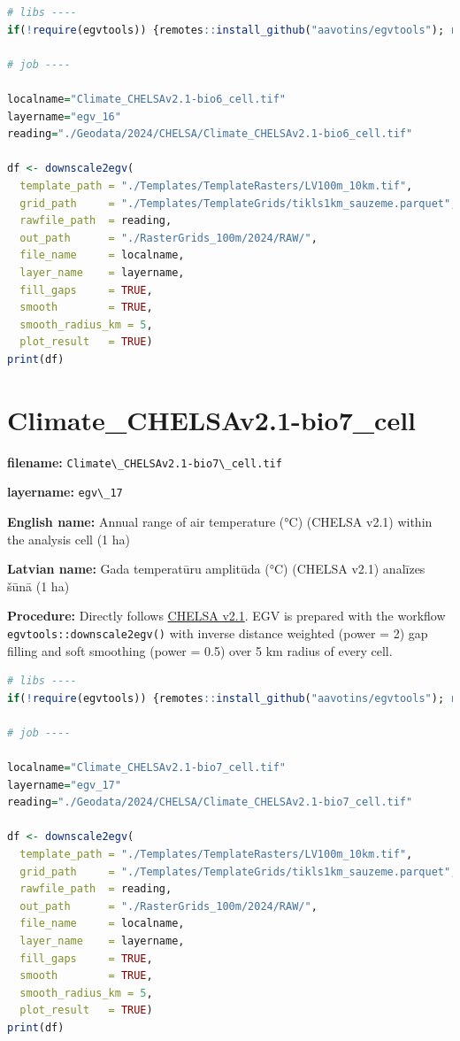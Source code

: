 \documentclass[
]{book}
\newcommand{\passthrough}[1]{#1}
\begin{document}
\begin{lstlisting}[language=R]
# libs ----
if(!require(egvtools)) {remotes::install_github("aavotins/egvtools"); require(egvtools)}

# job ----

localname="Climate_CHELSAv2.1-bio6_cell.tif"
layername="egv_16"
reading="./Geodata/2024/CHELSA/Climate_CHELSAv2.1-bio6_cell.tif"

df <- downscale2egv(
  template_path = "./Templates/TemplateRasters/LV100m_10km.tif",
  grid_path     = "./Templates/TemplateGrids/tikls1km_sauzeme.parquet",
  rawfile_path  = reading,
  out_path      = "./RasterGrids_100m/2024/RAW/",
  file_name     = localname,
  layer_name    = layername,
  fill_gaps     = TRUE,
  smooth        = TRUE,
  smooth_radius_km = 5,
  plot_result   = TRUE)
print(df)
\end{lstlisting}

\section{Climate\_CHELSAv2.1-bio7\_cell}\label{ch06.017}

\textbf{filename:} \passthrough{\lstinline!Climate\_CHELSAv2.1-bio7\_cell.tif!}

\textbf{layername:} \passthrough{\lstinline!egv\_17!}

\textbf{English name:} Annual range of air temperature (°C) (CHELSA v2.1) within the analysis cell (1 ha)

\textbf{Latvian name:} Gada temperatūru amplitūda (°C) (CHELSA v2.1) analīzes šūnā (1 ha)

\textbf{Procedure:} Directly follows \hyperref[Ch04.11]{CHELSA v2.1}. EGV is prepared with the
workflow \passthrough{\lstinline!egvtools::downscale2egv()!} with inverse distance weighted (power = 2)
gap filling and soft smoothing (power = 0.5) over 5 km radius of every cell.

\begin{lstlisting}[language=R]
# libs ----
if(!require(egvtools)) {remotes::install_github("aavotins/egvtools"); require(egvtools)}

# job ----

localname="Climate_CHELSAv2.1-bio7_cell.tif"
layername="egv_17"
reading="./Geodata/2024/CHELSA/Climate_CHELSAv2.1-bio7_cell.tif"

df <- downscale2egv(
  template_path = "./Templates/TemplateRasters/LV100m_10km.tif",
  grid_path     = "./Templates/TemplateGrids/tikls1km_sauzeme.parquet",
  rawfile_path  = reading,
  out_path      = "./RasterGrids_100m/2024/RAW/",
  file_name     = localname,
  layer_name    = layername,
  fill_gaps     = TRUE,
  smooth        = TRUE,
  smooth_radius_km = 5,
  plot_result   = TRUE)
print(df)
\end{lstlisting}
\end{document}
